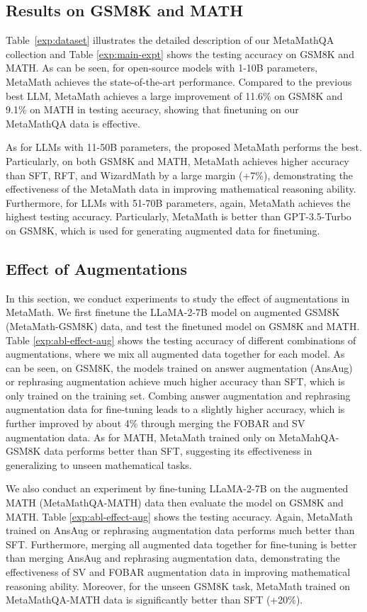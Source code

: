     \subsection{Results on GSM8K and MATH}

    Table~\ref{exp:dataset} illustrates the detailed description of our MetaMathQA collection and Table \ref{exp:main-expt}
    shows the testing accuracy on GSM8K and MATH. As can be seen, for open-source models with 1-10B parameters, MetaMath achieves the state-of-the-art performance. Compared to the previous best LLM, MetaMath achieves a large improvement of 11.6\% on GSM8K and 9.1\% on MATH in testing accuracy, showing that finetuning on our MetaMathQA data is effective.

    As for LLMs with 11-50B parameters, the proposed MetaMath performs the best. Particularly, on both GSM8K and MATH, MetaMath achieves higher accuracy than SFT, RFT, and WizardMath by a large margin (+7\%), demonstrating the effectiveness of the MetaMath data in improving mathematical reasoning ability. Furthermore, for LLMs with 51-70B parameters, again, MetaMath achieves the highest testing accuracy. Particularly, MetaMath is better than GPT-3.5-Turbo on GSM8K, which is used for generating augmented data for finetuning.

	\subsection{Effect of Augmentations} \label{sec:eff-aug}

	In this section, we conduct experiments to study the effect of augmentations in MetaMath. We first finetune the {LLaMA-2-7B} model on augmented GSM8K (MetaMath-GSM8K) data, and test the finetuned model on GSM8K and MATH. Table \ref{exp:abl-effect-aug}
	shows the testing accuracy of different combinations of augmentations{, where we mix all augmented data together for each model}. As can be seen, on GSM8K, the models trained on answer augmentation (AnsAug) or rephrasing  augmentation achieve much higher accuracy than SFT, which is only trained on the training set. Combing answer augmentation and rephrasing  augmentation data for fine-tuning leads to a slightly higher accuracy, which is further improved by about 4\% through merging the FOBAR and SV augmentation data. As for MATH, MetaMath trained only on MetaMahQA-GSM8K data performs better than SFT, suggesting its effectiveness in generalizing to unseen mathematical tasks. 

    We also conduct an experiment by fine-tuning {LLaMA-2-7B} on the augmented MATH (MetaMathQA-MATH) data then evaluate the model on GSM8K and MATH. Table \ref{exp:abl-effect-aug}
    shows the testing accuracy. Again, MetaMath trained on AnsAug or rephrasing augmentation data performs much better than SFT. Furthermore, merging all augmented data together for fine-tuning is better than merging AnsAug and rephrasing augmentation data, demonstrating the effectiveness of SV and FOBAR augmentation data in improving mathematical reasoning ability. Moreover, for the unseen GSM8K task, MetaMath trained on MetaMathQA-MATH data is significantly better than SFT (+20\%).

